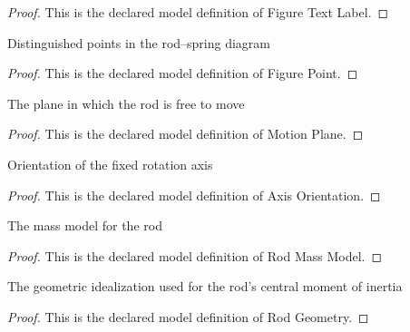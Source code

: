 \begin{proof}
  This is the declared model definition of Figure Text Label.
\end{proof}
\begin{definition}
  \label{def:physics:phyx-mini-0268:phyxminiproblems-problemphyxmini0268-figurepoint}
  Distinguished points in the rod--spring diagram
\end{definition}
\begin{proof}
  This is the declared model definition of Figure Point.
\end{proof}
\begin{definition}
  \label{def:physics:phyx-mini-0268:phyxminiproblems-problemphyxmini0268-motionplane}
  The plane in which the rod is free to move
\end{definition}
\begin{proof}
  This is the declared model definition of Motion Plane.
\end{proof}
\begin{definition}
  \label{def:physics:phyx-mini-0268:phyxminiproblems-problemphyxmini0268-axisorientation}
  Orientation of the fixed rotation axis
\end{definition}
\begin{proof}
  This is the declared model definition of Axis Orientation.
\end{proof}
\begin{definition}
  \label{def:physics:phyx-mini-0268:phyxminiproblems-problemphyxmini0268-rodmassmodel}
  The mass model for the rod
\end{definition}
\begin{proof}
  This is the declared model definition of Rod Mass Model.
\end{proof}
\begin{definition}
  \label{def:physics:phyx-mini-0268:phyxminiproblems-problemphyxmini0268-rodgeometry}
  The geometric idealization used for the rod's central moment of inertia
\end{definition}
\begin{proof}
  This is the declared model definition of Rod Geometry.
\end{proof}
